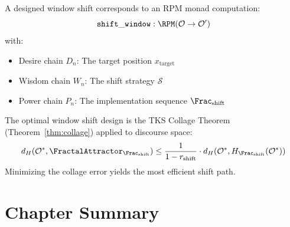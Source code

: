 \begin{proposition}
\label{prop:overton-rpm}
A designed window shift corresponds to an RPM monad computation:
\[
    \mathtt{shift\_window} : \RPM(\mathcal{O} \to \mathcal{O}')
\]
with:
\begin{itemize}
    \item Desire chain $D_n$: The target position $x_{\mathrm{target}}$
    \item Wisdom chain $W_n$: The shift strategy $\mathcal{S}$
    \item Power chain $P_n$: The implementation sequence $\Frac_{\mathrm{shift}}$
\end{itemize}
\end{proposition}

\begin{proposition}
\label{prop:overton-collage}
The optimal window shift design is the TKS Collage Theorem (Theorem~\ref{thm:collage})
applied to discourse space:
\[
    d_H(\mathcal{O}^*, \FractalAttractor_{\Frac_{\mathrm{shift}}}) \leq
    \frac{1}{1 - r_{\mathrm{shift}}} \cdot d_H(\mathcal{O}^*,
    H_{\Frac_{\mathrm{shift}}}(\mathcal{O}^*))
\]
Minimizing the collage error yields the most efficient shift path.
\end{proposition}

\section{Chapter Summary}
\label{sec:overton-summary}

